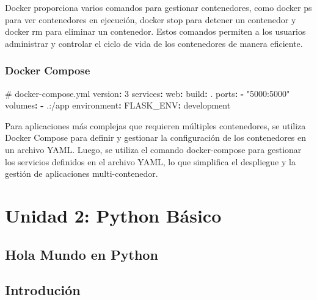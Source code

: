 \documentclass[
  a4paper,
  DIV=11,
  numbers=noendperiod,
  onepage,
  openany]{scrreprt}
\newenvironment{Shaded}{\begin{snugshade}}{\end{snugshade}}
\newcommand{\AttributeTok}[1]{\textcolor[rgb]{0.40,0.45,0.13}{#1}}
\newcommand{\CommentTok}[1]{\textcolor[rgb]{0.37,0.37,0.37}{#1}}
\newcommand{\FunctionTok}[1]{\textcolor[rgb]{0.28,0.35,0.67}{#1}}
\newcommand{\KeywordTok}[1]{\textcolor[rgb]{0.00,0.23,0.31}{\textbf{#1}}}
\newcommand{\StringTok}[1]{\textcolor[rgb]{0.13,0.47,0.30}{#1}}
\begin{document}
Docker proporciona varios comandos para gestionar contenedores, como
docker ps para ver contenedores en ejecución, docker stop para detener
un contenedor y docker rm para eliminar un contenedor. Estos comandos
permiten a los usuarios administrar y controlar el ciclo de vida de los
contenedores de manera eficiente.

\section{Docker Compose 📙}\label{docker-compose-1}

\begin{Shaded}
\begin{Highlighting}[]
\CommentTok{\# docker{-}compose.yml}
\FunctionTok{version}\KeywordTok{:}\AttributeTok{ }\StringTok{\textquotesingle{}3\textquotesingle{}}
\FunctionTok{services}\KeywordTok{:}
\AttributeTok{  }\FunctionTok{web}\KeywordTok{:}
\AttributeTok{    }\FunctionTok{build}\KeywordTok{:}\AttributeTok{ .}
\AttributeTok{    }\FunctionTok{ports}\KeywordTok{:}
\AttributeTok{      }\KeywordTok{{-}}\AttributeTok{ }\StringTok{"5000:5000"}
\AttributeTok{    }\FunctionTok{volumes}\KeywordTok{:}
\AttributeTok{      }\KeywordTok{{-}}\AttributeTok{ .:/app}
\AttributeTok{    }\FunctionTok{environment}\KeywordTok{:}
\AttributeTok{      }\FunctionTok{FLASK\_ENV}\KeywordTok{:}\AttributeTok{ development}
\end{Highlighting}
\end{Shaded}

Para aplicaciones más complejas que requieren múltiples contenedores, se
utiliza Docker Compose para definir y gestionar la configuración de los
contenedores en un archivo YAML. Luego, se utiliza el comando
docker-compose para gestionar los servicios definidos en el archivo
YAML, lo que simplifica el despliegue y la gestión de aplicaciones
multi-contenedor.

\part{Unidad 2: Python Básico}

\chapter{Hola Mundo en Python}\label{hola-mundo-en-python}

\chapter{Introdución 🫥}\label{introduciuxf3n}
\end{document}
